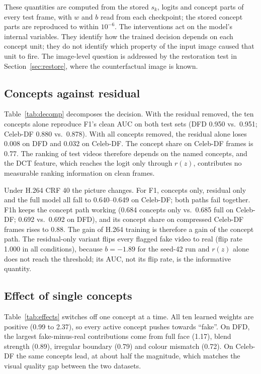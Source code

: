 \documentclass[conference]{IEEEtran}
\begin{document}
These quantities are computed from the stored $s_k$, logits and concept parts of every test frame, with $w$ and $b$
read from each checkpoint; the stored concept parts are reproduced to within $10^{-6}$. The interventions act on
the model's internal variables. They identify how the trained decision depends on each concept unit; they do not
identify which property of the input image caused that unit to fire. The image-level question is addressed by the
restoration test in Section~\ref{sec:restore}, where the counterfactual image is known.



\subsection{Concepts against residual}
Table~\ref{tab:decomp} decomposes the decision. With the residual removed, the ten concepts alone reproduce F1's
clean AUC on both test sets (DFD 0.950 vs.\ 0.951; Celeb-DF 0.880 vs.\ 0.878). With all concepts removed, the
residual alone loses 0.008 on DFD and 0.032 on Celeb-DF. The concept share on Celeb-DF frames is 0.77. The ranking
of test videos therefore depends on the named concepts, and the DCT feature, which reaches the logit only through
$r(z)$, contributes no measurable ranking information on clean frames.

Under H.264 CRF 40 the picture changes. For F1, concepts only, residual only and the full model all fall to
0.640--0.649 on Celeb-DF; both paths fail together. F1h keeps the concept path working (0.684 concepts only vs.\
0.685 full on Celeb-DF; 0.692 vs.\ 0.692 on DFD), and its concept share on compressed Celeb-DF frames rises to 0.88.
The gain of H.264 training is therefore a gain of the concept path. The residual-only variant flips every flagged
fake video to real (flip rate 1.000 in all conditions), because $b=-1.89$ for the seed-42 run and $r(z)$ alone does
not reach the threshold; its AUC, not its flip rate, is the informative quantity.



\subsection{Effect of single concepts}
Table~\ref{tab:effects} switches off one concept at a time. All ten learned weights are positive (0.99 to 2.37), so
every active concept pushes towards ``fake''. On DFD, the largest fake-minus-real contributions come from full face
(1.17), blend strength (0.89), irregular boundary (0.79) and colour mismatch (0.72). On Celeb-DF the same concepts
lead, at about half the magnitude, which matches the visual quality gap between the two datasets.
\end{document}

